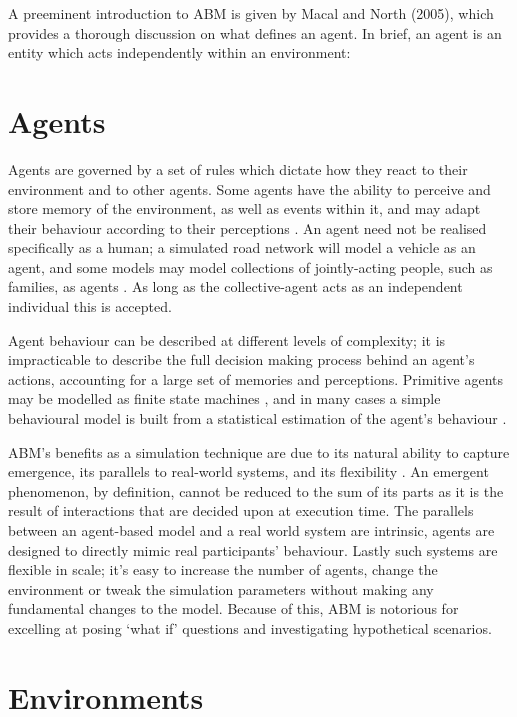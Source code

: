A preeminent introduction to ABM is given by Macal and North (2005), which provides a thorough discussion on what defines an agent. In brief, an agent is an entity which acts independently within an environment:

\section{Agents}
Agents are governed by a set of rules which dictate how they react to their environment and to other agents. Some agents have the ability to perceive and store memory of the environment, as well as events within it, and may adapt their behaviour according to their perceptions \cite{Macal2005TutorialSimulation}. An agent need not be realised specifically as a human; a simulated road network will model a vehicle as an agent, and some models may model collections of jointly-acting people, such as families, as agents \cite{Zhang2009Agent-basedEvacuation}. As long as the collective-agent acts as an independent individual this is accepted.

Agent behaviour can be described at different levels of complexity; it is impracticable to describe the full decision making process behind an agent's actions, accounting for a large set of memories and perceptions. Primitive agents may be modelled as finite state machines \cite{Ren2009Agent-BasedEvacuation}, and in many cases a simple behavioural model is built from a statistical estimation of the agent's behaviour \cite{Dawson2011AnManagement}.

ABM's benefits as a simulation technique are due to its natural ability to capture emergence, its parallels to real-world systems, and its flexibility \cite{Bonabeau2002Agent-basedSystems.}. An emergent phenomenon, by definition, cannot be reduced to the sum of its parts as it is the result of interactions that are decided upon at execution time. The parallels between an agent-based model and a real world system are intrinsic, agents are designed to directly mimic real participants' behaviour. Lastly such systems are flexible in scale; it's easy to increase the number of agents, change the environment or tweak the simulation parameters without making any fundamental changes to the model. Because of this, ABM is notorious for excelling at posing `what if' questions and investigating hypothetical scenarios.

\section{Environments}

